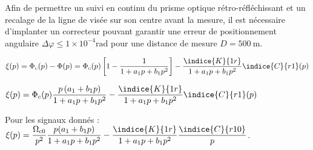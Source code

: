 \ifprof
\else
Afin de permettre un suivi en continu du prisme optique rétro-réfléchissant et un recalage de la ligne de visée sur son centre avant la mesure, il est nécessaire d'implanter un correcteur pouvant garantir une erreur de positionnement angulaire $\Delta \varphi \leqslant 1 \times 10^{-4} \mathrm{rad}$ pour une distance de mesure $D=500 \mathrm{~m}$.\\
\fi

\ifprof
\begin{corrige}
$\xi(p)=\Phi_c (p)-\Phi(p)=\Phi_c (p)  \left[1- \dfrac{1}{1+a_1 p +b_1   p ^2 }\right]-\dfrac{\indice{K}{1r}}{1+a_1 p +b_1   p ^2 }   \indice{C}{r1} (p)$

$\xi(p)=\Phi_c (p)   \dfrac{p  \left(a_1+b_1  p \right)}{1+a_1 p +b_1   p ^2 }-\dfrac{\indice{K}{1r}}{1+a_1 p +b_1   p ^2 }   \indice{C}{r1} (p)$

Pour les signaux donnés : $\xi(p)=\dfrac{\Omega_{\text{c0}}}{p^2}     \dfrac{p  (a_1+b_1  p )}{1+a_1 p +b_1   p ^2 }-\dfrac{\indice{K}{1r}}{1+a_1 p +b_1   p ^2 } \dfrac{\indice{C}{r10}}{p}$.

\end{corrige}
\else
\fi



